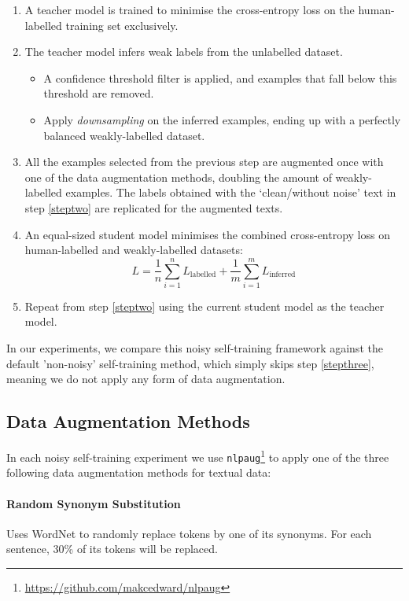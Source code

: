 \documentclass[11pt,a4paper]{article}
\begin{document}
\begin{enumerate}
\item A teacher model is trained to minimise the cross-entropy loss on the human-labelled training set exclusively.
\item The teacher model infers weak labels from the unlabelled dataset. \label{steptwo}
\begin{itemize}
\item A confidence threshold filter is applied, and examples that fall below this threshold are removed.
\item Apply \textit{downsampling} on the inferred examples, ending up with a perfectly balanced weakly-labelled dataset.
\end{itemize}
\item All the examples selected from the previous step are augmented once with one of the data augmentation methods, doubling the amount of weakly-labelled examples. The labels obtained with the `clean/without noise' text in step \ref{steptwo} are replicated for the augmented texts. \label{stepthree}
\item An equal-sized student model minimises the combined cross-entropy loss on human-labelled and weakly-labelled datasets:
\begin{equation}
L =\frac{1}{n}\sum_{i=1}^{n}L_{\mathrm{labelled}}+\frac{1}{m}\sum_{i=1}^{m}L_{\mathrm{inferred}}
\label{eq:loss}
\end{equation}
\item Repeat from step \ref{steptwo} using the current student model as the teacher model.

\end{enumerate}

In our experiments, we compare this noisy self-training framework against the default 'non-noisy' self-training method, which simply skips step \ref{stepthree}, meaning we do not apply any form of data augmentation.

\subsection{Data Augmentation Methods} \label{sec:data_augmentations}
In each noisy self-training experiment we use \texttt{nlpaug}\footnote{\url{https://github.com/makcedward/nlpaug}} to apply one of the three following data augmentation methods for textual data:

\paragraph*{Random Synonym Substitution} Uses WordNet \cite{miller1995wordnet} to randomly replace tokens by one of its synonyms. For each sentence, 30\% of its tokens will be replaced.
\end{document}
